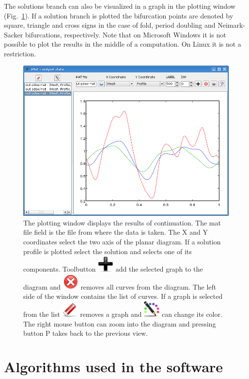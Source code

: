 \documentclass[10pt,a4paper]{ddedoc}
\newcommand{\iconAdd}{\protect\includegraphics[height=0.8\baselineskip]{fig/cr32-action-add}}
\newcommand{\iconEraser}{\protect\includegraphics[height=0.8\baselineskip]{fig/cr32-action-eraser}}
\newcommand{\iconColorize}{\protect\includegraphics[height=0.8\baselineskip]{fig/cr32-action-colorize}}
\newcommand{\iconRemove}{\protect\includegraphics[height=0.8\baselineskip]{fig/cr32-action-remove}}
\begin{document}
The solutions branch can also be visualized in a graph in the plotting window (Fig.\
\ref{plotwindow}). If a solution branch is plotted the bifurcation points are
denoted by square, triangle and cross signs in the case of fold, period doubling
and Neimark-Sacker bifurcations, respectively. Note that on Microsoft Windows it is not
possible to plot the results in the middle of a computation. On Linux it is not
a restriction.
\begin{figure}[bth!]
\begin{center}
\includegraphics[scale=0.5]{fig/plotwindow}
\caption{The plotting window displays the results of continuation. The {\sc{}mat} file field is the file from where the data is taken.
The X and Y coordinates select the two axis of the planar diagram. If a solution profile is plotted \filef{LABEL} select the solution 
and \filef{DIM} selects one of its components. Toolbutton \iconAdd{} add the selected graph to the diagram and 
\iconRemove{} removes all curves from the diagram.
The left side of the window contains the list of curves. If a graph is selected from the list \iconEraser{} removes a graph and \iconColorize{} can change its color.
The right mouse button can zoom into the diagram and pressing button P takes back to the previous view.}
\label{plotwindow}
\end{center}
\end{figure}

\section{Algorithms used in the software}
\end{document}
